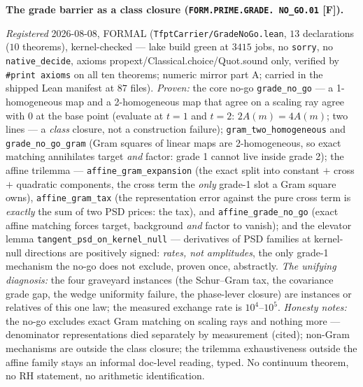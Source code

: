 \par\smallskip\noindent\textbf{The grade barrier as a class
closure (\texttt{FORM.PRIME.\allowbreak GRADE.\allowbreak
NO\_GO.01} [F]).}
{\sloppy
\emph{Registered} 2026-08-08, FORMAL
(\texttt{TfptCarrier/GradeNoGo.lean}, $13$ declarations ($10$
theorems), kernel-checked --- lake build green at $3415$ jobs,
no \texttt{sorry}, no \texttt{native\_decide}, axioms
propext/Classical.choice/Quot.sound only, verified by
\texttt{\#print axioms} on all ten theorems; numeric mirror
 part A; carried in the
shipped Lean manifest at $87$ files).  \emph{Proven:} the core
no-go \texttt{grade\_no\_go} --- a 1-homogeneous map and a
2-homogeneous map that agree on a scaling ray agree with $0$ at
the base point (evaluate at $t = 1$ and $t = 2$: $2A(m) =
4A(m)$; two lines --- a \emph{class} closure, not a
construction failure); \texttt{gram\_two\_homogeneous} and
\texttt{grade\_no\_go\_gram} (Gram squares of linear maps are
2-homogeneous, so exact matching annihilates target \emph{and}
factor: grade 1 cannot live inside grade 2); the affine
trilemma --- \texttt{affine\_gram\_expansion} (the exact split
into constant $+$ cross $+$ quadratic components, the cross
term the \emph{only} grade-1 slot a Gram square owns),
\texttt{affine\_gram\_tax} (the representation error against
the pure cross term is \emph{exactly} the sum of two PSD
prices: the tax), and \texttt{affine\_grade\_no\_go} (exact
affine matching forces target, background \emph{and} factor to
vanish); and the elevator lemma
\texttt{tangent\_psd\_on\_kernel\_null} --- derivatives of PSD
families at kernel-null directions are positively signed:
\emph{rates, not amplitudes}, the only grade-1 mechanism the
no-go does not exclude, proven once, abstractly.  \emph{The
unifying diagnosis:} the four graveyard instances (the
Schur--Gram tax, the covariance grade gap, the wedge uniformity
failure, the phase-lever closure) are instances or relatives of
this one law; the measured exchange rate is $10^4$--$10^5$.
\emph{Honesty notes:} the no-go excludes exact Gram matching on
scaling rays and nothing more --- denominator representations
died separately by measurement (cited); non-Gram mechanisms are
outside the class closure; the trilemma exhaustiveness outside
the affine family stays an informal doc-level reading, typed.
No continuum theorem, no RH statement, no arithmetic
identification.\par}


